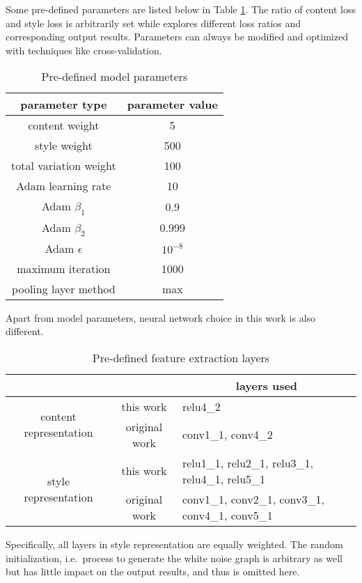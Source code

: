 Some pre-defined parameters are listed below in Table \ref{table:parameters}.
The ratio of content loss and style loss is arbitrarily set while \cite{Gatys:2016gj}
explores different loss ratios and corresponding output results.
Parameters can always be modified and optimized with techniques like cross-validation.

	\begin{table}[!htb]
	\center
	\begin{tabular}{c|c}
	\hline
	parameter type & parameter value \\ \hline
	content weight & 5 \\
	style weight & 500 \\
	total variation weight & 100 \\
	Adam learning rate & 10 \\
	Adam $\beta_1$ & 0.9 \\
	Adam $\beta_2$ & 0.999 \\
	Adam $\epsilon$ & $10^{-8}$ \\
	maximum iteration & 1000 \\
	pooling layer method & max \\
	\hline
	\end{tabular}
	\caption{Pre-defined model parameters}
	\label{table:parameters}
	\end{table}

Apart from model parameters, neural network choice in this work is also different.
	
	\begin{table}[!htb]
	\center
	\begin{tabular}{c|c|l}
	\hline
	& & \multicolumn{1}{c}{layers used} \\ \hline
	\multirow{2}{*}{content representation}
		& this work & relu4\_2 \\
		& original work & conv1\_1, conv4\_2 \\
	\multirow{2}{*}{style representation}
		& this work & relu1\_1, relu2\_1, relu3\_1, relu4\_1, relu5\_1 \\
		& original work & conv1\_1, conv2\_1, conv3\_1, conv4\_1, conv5\_1 \\
	\hline
	\end{tabular}
	\caption{Pre-defined feature extraction layers}
	\label{table:layers}
	\end{table}

Specifically, all layers in style representation are equally weighted.
The random initialization, i.e.\ process to generate the white noise graph
is arbitrary as well but has little impact on the output results,
and thus is omitted here.
